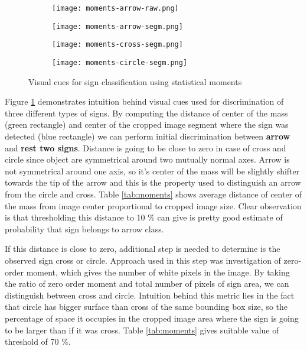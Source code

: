 \begin{figure}[th!]
	\centering
	\begin{subfigure}[b]{0.25\textwidth}
		\centering
		\texttt{[image: moments-arrow-raw.png]}
	\end{subfigure}
	\begin{subfigure}[b]{0.25\textwidth}
		\centering
		\texttt{[image: moments-arrow-segm.png]}
	\end{subfigure}
	\begin{subfigure}[b]{0.2\textwidth}
		\centering
		\texttt{[image: moments-cross-segm.png]}
	\end{subfigure}
	\begin{subfigure}[b]{0.2\textwidth}
		\centering
		\texttt{[image: moments-circle-segm.png]}
	\end{subfigure}
	\caption{Visual cues for sign classification using statistical moments}
	\label{fig:statistical-moments}
\end{figure}

Figure \ref{fig:statistical-moments} demonstrates intuition behind visual cues used for discrimination of three different types of signs. By computing the distance of center of the mass (green rectangle) and center of the cropped image segment where the sign was detected (blue rectangle) we can perform initial discrimination between \textbf{arrow} and \textbf{rest two signs}. Distance is going to be close to zero in case of cross and circle since object are symmetrical around two mutually normal axes. Arrow is not symmetrical around one axis, so it's center of the mass will be slightly shifter towards the tip of the arrow and this is the property used to distinguish an arrow from the circle and cross.
Table \ref{tab:moments} shows average distance of center of the mass from image center proportional to cropped image size. Clear observation is that thresholding this distance to 10 $\%$ can give is pretty good estimate of probability that sign belongs to arrow class.

If this distance is close to zero, additional step is needed to determine is the observed sign cross or circle. Approach used in this step was investigation of zero-order moment, which gives the number of white pixels in the image. By taking the ratio of zero order moment and total number of pixels of sign area, we can distinguish between cross and circle. Intuition behind this metric lies in the fact that circle has bigger surface than cross of the same bounding box size, so the percentage of space it occupies in the cropped image area where the sign is going to be larger than if it was cross. Table \ref{tab:moments} gives suitable value of threshold of 70 $\%$.

